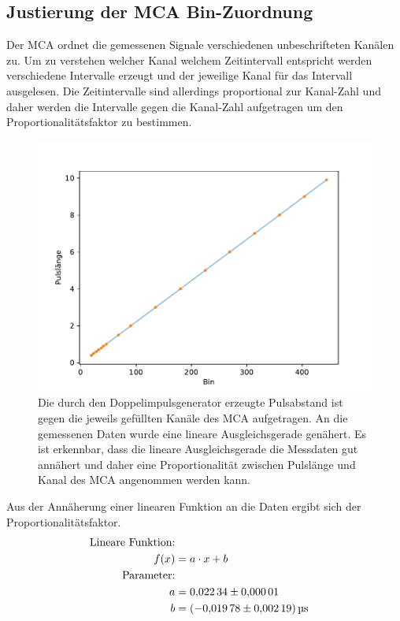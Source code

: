 \subsection{Justierung der MCA Bin-Zuordnung}
Der MCA ordnet die gemessenen Signale verschiedenen unbeschrifteten Kanälen zu.
Um zu verstehen welcher Kanal welchem Zeitintervall entspricht werden verschiedene Intervalle erzeugt und der jeweilige Kanal für das Intervall ausgelesen.
Die Zeitintervalle sind allerdings proportional zur Kanal-Zahl und daher werden die Intervalle gegen die Kanal-Zahl aufgetragen um den Proportionalitätsfaktor zu bestimmen.
\begin{figure}[ht]
    \centering
    \includegraphics[scale = 1]{./plots/bins.pdf}
    \caption{Die durch den Doppelimpulsgenerator erzeugte Pulsabstand ist gegen die jeweils gefüllten Kanäle des MCA aufgetragen. An die gemessenen Daten wurde eine lineare Ausgleichsgerade genähert. Es ist erkennbar, dass die lineare Ausgleichsgerade die Messdaten gut annähert und daher eine Proportionalität zwischen Pulslänge und Kanal des MCA angenommen werden kann.}
    \label{fig:bins}
\end{figure}
Aus der Annäherung einer linearen Funktion an die Daten ergibt sich der Proportionalitätsfaktor.
\begin{align*}
    \text{Lineare Funktion:}\\
    f(x) &= a \cdot x + b\\
    \text{Parameter:}\\
    a &= \num{0.02234 +- 0.00001}\\
    b &= \SI{ -0.01978 +- 0.00219}{\micro\second}
\end{align*}

